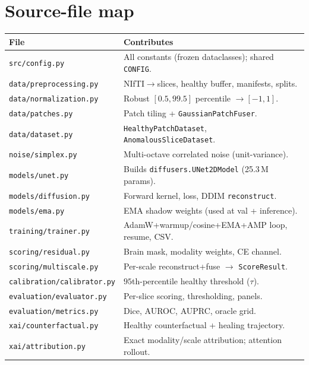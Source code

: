 \documentclass[11pt,a4paper]{article}
\newcommand{\code}[1]{\texttt{\small #1}}
\begin{document}
\section{Source-file map}
\begin{longtable}{@{}ll@{}}
\toprule
File & Contributes \\
\midrule
\code{src/config.py} & All constants (frozen dataclasses); shared \code{CONFIG}. \\
\code{data/preprocessing.py} & NIfTI$\to$slices, healthy buffer, manifests, splits. \\
\code{data/normalization.py} & Robust $[0.5,99.5]$ percentile $\to[-1,1]$. \\
\code{data/patches.py} & Patch tiling + \code{GaussianPatchFuser}. \\
\code{data/dataset.py} & \code{HealthyPatchDataset}, \code{AnomalousSliceDataset}. \\
\code{noise/simplex.py} & Multi-octave correlated noise (unit-variance). \\
\code{models/unet.py} & Builds \code{diffusers.UNet2DModel} (25.3\,M params). \\
\code{models/diffusion.py} & Forward kernel, loss, DDIM \code{reconstruct}. \\
\code{models/ema.py} & EMA shadow weights (used at val + inference). \\
\code{training/trainer.py} & AdamW+warmup/cosine+EMA+AMP loop, resume, CSV. \\
\code{scoring/residual.py} & Brain mask, modality weights, CE channel. \\
\code{scoring/multiscale.py} & Per-scale reconstruct+fuse $\to$ \code{ScoreResult}. \\
\code{calibration/calibrator.py} & $95$th-percentile healthy threshold ($\tau$). \\
\code{evaluation/evaluator.py} & Per-slice scoring, thresholding, panels. \\
\code{evaluation/metrics.py} & Dice, AUROC, AUPRC, oracle grid. \\
\code{xai/counterfactual.py} & Healthy counterfactual + healing trajectory. \\
\code{xai/attribution.py} & Exact modality/scale attribution; attention rollout. \\
\bottomrule
\end{longtable}
\end{document}
